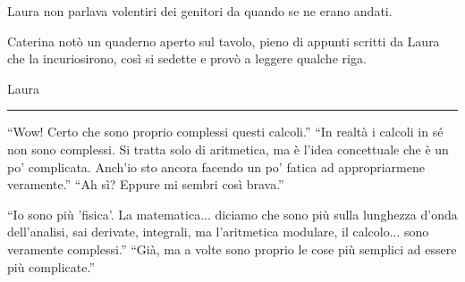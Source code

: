 Laura non parlava volentiri dei genitori da quando se ne erano andati.

Caterina  notò un quaderno aperto sul tavolo, pieno di appunti scritti da Laura che  la incuriosirono, così si sedette e provò a leggere qualche riga.
\begin{center}
\begin{minipage}{0.7\textwidth}
    \centering
    
\end{minipage}
\end{center}
\vspace{1em}
\begin{center}Laura\end{center}
\hrule
\vspace{1em}

\begin{dialogue}
 \enquote{Wow! Certo che sono proprio complessi questi calcoli.}
 \enquote{In realtà i calcoli in sé non sono complessi. Si tratta solo di aritmetica, ma è l'idea concettuale che è un po' complicata. Anch'io sto ancora facendo un po' fatica ad appropriarmene veramente.}
 \enquote{Ah sì? Eppure mi sembri così brava.}

 \enquote{Io sono più 'fisica'. La matematica... diciamo che sono più sulla lunghezza d'onda dell'analisi, sai derivate, integrali,  ma l'aritmetica modulare, il calcolo... sono veramente complessi.}
 \enquote{Già, ma a volte sono proprio le cose più semplici ad essere più complicate.}
\end{dialogue}

